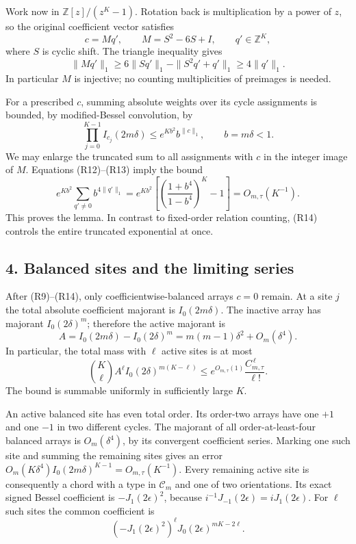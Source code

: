 Work now in \(\mathbb Z[z]/(z^K-1)\). Rotation back is multiplication by
a power of \(z\), so the original coefficient vector satisfies
\[
 c=Mq',\qquad M=S^2-6S+I,\qquad q'\in\mathbb Z^K,              \tag{R12}
\]
where \(S\) is cyclic shift. The triangle inequality gives
\[
 \|Mq'\|_1\ge6\|Sq'\|_1-\|S^2q'+q'\|_1\ge4\|q'\|_1.
                                                               \tag{R13}
\]
In particular \(M\) is injective; no counting multiplicities of preimages
is needed.

For a prescribed \(c\), summing absolute weights over its cycle assignments
is bounded, by modified-Bessel convolution, by
\[
 \prod_{j=0}^{K-1} I_{c_j}(2m\delta)
       \le e^{Kb^2}b^{\|c\|_1},\qquad b=m\delta<1.
\]
We may enlarge the truncated sum to all assignments with \(c\) in the
integer image of \(M\). Equations (R12)--(R13) imply the bound
\[
 e^{Kb^2}\sum_{q'\ne0}b^{4\|q'\|_1}
  =e^{Kb^2}\left[\left(\frac{1+b^4}{1-b^4}\right)^K-1\right]
  =O_{m,\tau}(K^{-1}).                                      \tag{R14}
\]
This proves the lemma. In contrast to fixed-order relation counting,
(R14) controls the entire truncated exponential at once.

\hypertarget{harmonic-returns-balanced-sites-and-the-limiting-series}{%
\subsection{4. Balanced sites and the limiting series}\label{harmonic-returns-balanced-sites-and-the-limiting-series}}

After (R9)--(R14), only coefficientwise-balanced arrays \(c=0\) remain.
At a site \(j\) the total absolute coefficient majorant is \(I_0(2m\delta)\).
The inactive array has majorant \(I_0(2\delta)^m\); therefore the active
majorant is
\[
 A=I_0(2m\delta)-I_0(2\delta)^m
             =m(m-1)\delta^2+O_m(\delta^4).
\]
In particular, the total mass with \(\ell\) active sites is at most
\[
 \binom K\ell A^\ell I_0(2\delta)^{m(K-\ell)}
       \le e^{O_{m,\tau}(1)}\frac{C_{m,\tau}^{\,\ell}}{\ell!}.  \tag{R15}
\]
The bound is summable uniformly in sufficiently large \(K\).

An active balanced site has even total order. Its order-two arrays have
one \(+1\) and one \(-1\) in two different cycles. The majorant of all
order-at-least-four balanced arrays is \(O_m(\delta^4)\), by its convergent
coefficient series. Marking one such site and summing the remaining sites
gives an error
\(O_m(K\delta^4)I_0(2m\delta)^{K-1}=O_{m,\tau}(K^{-1})\).
Every remaining active site is consequently a chord with a type in
\(\mathcal C_m\) and one of two orientations. Its exact signed Bessel
coefficient is \(-J_1(2\epsilon)^2\), because
\(i^{-1}J_{-1}(2\epsilon)=iJ_1(2\epsilon)\).
For \(\ell\) such sites the common coefficient is
\[
 (-J_1(2\epsilon)^2)^\ell J_0(2\epsilon)^{mK-2\ell}.           \tag{R16}
\]

